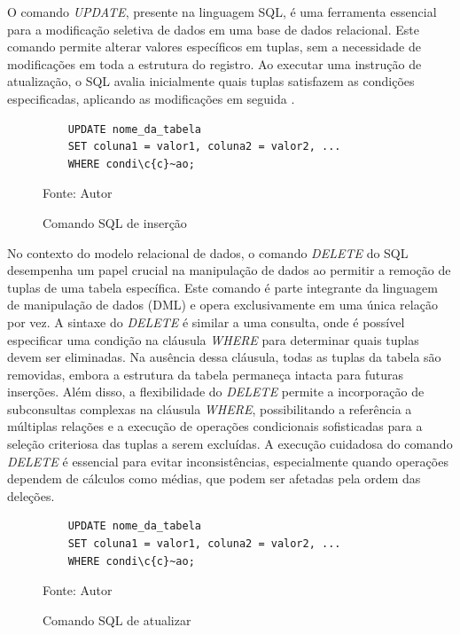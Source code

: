 
O comando \textit{UPDATE}, presente na linguagem SQL, é uma ferramenta essencial para a modificação seletiva de dados em uma base de dados relacional. Este comando permite alterar valores específicos em tuplas, sem a necessidade de modificações em toda a estrutura do registro. Ao executar uma instrução de atualização, o SQL avalia inicialmente quais tuplas satisfazem as condições especificadas, aplicando as modificações em seguida \cite{silberschatz2011database}.

\begin{figure}[H]
    \centering
    \begin{lstlisting}
    UPDATE nome_da_tabela
    SET coluna1 = valor1, coluna2 = valor2, ...
    WHERE condi\c{c}~ao;
    \end{lstlisting}
    \caption{Comando SQL de inserção}
    Fonte: Autor
    \label{lst:update}
\end{figure}



No contexto do modelo relacional de dados, o comando \textit{DELETE} do SQL desempenha um papel crucial na manipulação de dados ao permitir a remoção de tuplas de uma tabela específica. Este comando é parte integrante da linguagem de manipulação de dados (DML) e opera exclusivamente em uma única relação por vez. A sintaxe do \textit{DELETE} é similar a uma consulta, onde é possível especificar uma condição na cláusula \textit{WHERE} para determinar quais tuplas devem ser eliminadas. Na ausência dessa cláusula, todas as tuplas da tabela são removidas, embora a estrutura da tabela permaneça intacta para futuras inserções. Além disso, a flexibilidade do \textit{DELETE} permite a incorporação de subconsultas complexas na cláusula \textit{WHERE}, possibilitando a referência a múltiplas relações e a execução de operações condicionais sofisticadas para a seleção criteriosa das tuplas a serem excluídas. A execução cuidadosa do comando \textit{DELETE} é essencial para evitar inconsistências, especialmente quando operações dependem de cálculos como médias, que podem ser afetadas pela ordem das deleções\cite{silberschatz2011database}.

\begin{figure}[H]
    \centering
    \begin{lstlisting}
    UPDATE nome_da_tabela
    SET coluna1 = valor1, coluna2 = valor2, ...
    WHERE condi\c{c}~ao;
    \end{lstlisting}
    \caption{Comando SQL de atualizar}
    Fonte: Autor
    \label{lst:delete}
\end{figure}

